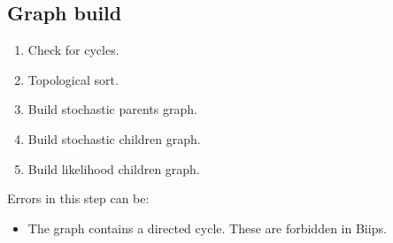 \documentclass[11pt, a4paper, titlepage]{report}
\newcommand{\biips}{\textsf{Biips}}
\begin{document}
\subsection{Graph build}
 \begin{enumerate}
 \item Check for cycles.
 \item Topological sort.
 \item Build stochastic parents graph.
 \item Build stochastic children graph.
 \item Build likelihood children graph.
 \end{enumerate}
  Errors in this step can be:
  \begin{itemize}
  \item The graph contains a directed cycle.  These are forbidden
  in \biips.
  \end{itemize}
\end{document}
